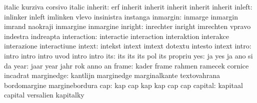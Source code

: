                            italic                    kurziva
                           corsivo                   italic
                  inherit: erf                       inherit
                           inherit                   inherit
                           inherit                   inherit %
                   inleft: inlinker                  inleft
                           imlinken                  vlevo
                           insinistra                instanga
                 inmargin: inmarge                   inmargin
                           imrand                    naokraji
                           inmargine                 inmargine
                  inright: inrechter                 inright
                           imrechten                 vpravo
                           indestra                  indreapta
              interaction: interactie                interaction
                           interaktion               interakce
                           interazione               interactiune
                   intext: intekst                   intext
                           imtext                    dotextu
                           intesto                   intext
                    intro: intro                     intro
                           intro                     uvod
                           intro                     intro
                      its: its                       its
                           its                       pol
                           its                       propriu %
                      yes: ja                        yes
                           ja                        ano
                           si                        da
                     year: jaar                      year
                           jahr                      rok
                           anno                      an
                    frame: kader                     frame
                           rahmen                    ramecek
                           cornice                   incadrat
               marginedge: kantlijn                  marginedge
                           marginalkante             textovahrana
                           bordomargine              marginebordura
                      cap: kap                       cap
                           kap                       kap
                           cap                       cap
                  capital: kapitaal                  capital
                           versalien                 kapitalky
